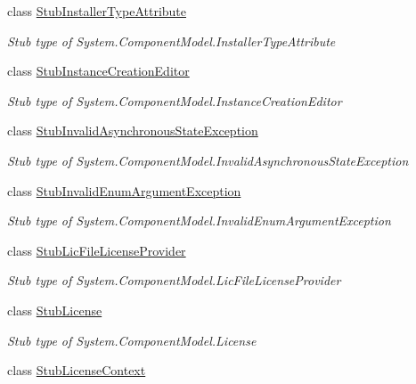 \begin{DoxyCompactItemize}
class \hyperlink{class_system_1_1_component_model_1_1_fakes_1_1_stub_installer_type_attribute}{Stub\-Installer\-Type\-Attribute}
\begin{DoxyCompactList}\small\item\em Stub type of System.\-Component\-Model.\-Installer\-Type\-Attribute\end{DoxyCompactList}\item 
class \hyperlink{class_system_1_1_component_model_1_1_fakes_1_1_stub_instance_creation_editor}{Stub\-Instance\-Creation\-Editor}
\begin{DoxyCompactList}\small\item\em Stub type of System.\-Component\-Model.\-Instance\-Creation\-Editor\end{DoxyCompactList}\item 
class \hyperlink{class_system_1_1_component_model_1_1_fakes_1_1_stub_invalid_asynchronous_state_exception}{Stub\-Invalid\-Asynchronous\-State\-Exception}
\begin{DoxyCompactList}\small\item\em Stub type of System.\-Component\-Model.\-Invalid\-Asynchronous\-State\-Exception\end{DoxyCompactList}\item 
class \hyperlink{class_system_1_1_component_model_1_1_fakes_1_1_stub_invalid_enum_argument_exception}{Stub\-Invalid\-Enum\-Argument\-Exception}
\begin{DoxyCompactList}\small\item\em Stub type of System.\-Component\-Model.\-Invalid\-Enum\-Argument\-Exception\end{DoxyCompactList}\item 
class \hyperlink{class_system_1_1_component_model_1_1_fakes_1_1_stub_lic_file_license_provider}{Stub\-Lic\-File\-License\-Provider}
\begin{DoxyCompactList}\small\item\em Stub type of System.\-Component\-Model.\-Lic\-File\-License\-Provider\end{DoxyCompactList}\item 
class \hyperlink{class_system_1_1_component_model_1_1_fakes_1_1_stub_license}{Stub\-License}
\begin{DoxyCompactList}\small\item\em Stub type of System.\-Component\-Model.\-License\end{DoxyCompactList}\item 
class \hyperlink{class_system_1_1_component_model_1_1_fakes_1_1_stub_license_context}{Stub\-License\-Context}

\end{DoxyCompactItemize}
